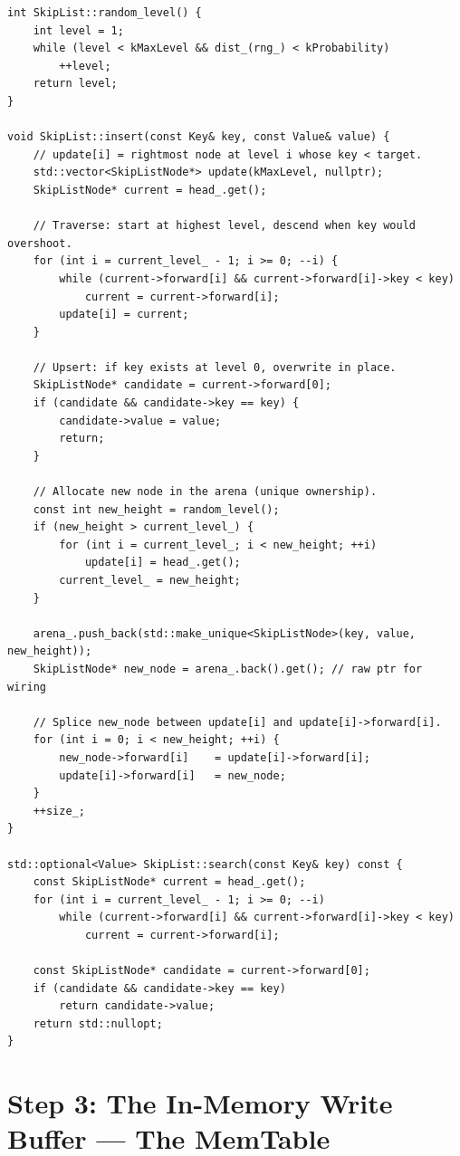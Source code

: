 \documentclass[11pt,a4paper]{article}
\begin{document}
\begin{lstlisting}[style=cpp, caption={Skip List Insert and Search: \texttt{src/skiplist.cpp}}]
int SkipList::random_level() {
    int level = 1;
    while (level < kMaxLevel && dist_(rng_) < kProbability)
        ++level;
    return level;
}

void SkipList::insert(const Key& key, const Value& value) {
    // update[i] = rightmost node at level i whose key < target.
    std::vector<SkipListNode*> update(kMaxLevel, nullptr);
    SkipListNode* current = head_.get();

    // Traverse: start at highest level, descend when key would overshoot.
    for (int i = current_level_ - 1; i >= 0; --i) {
        while (current->forward[i] && current->forward[i]->key < key)
            current = current->forward[i];
        update[i] = current;
    }

    // Upsert: if key exists at level 0, overwrite in place.
    SkipListNode* candidate = current->forward[0];
    if (candidate && candidate->key == key) {
        candidate->value = value;
        return;
    }

    // Allocate new node in the arena (unique ownership).
    const int new_height = random_level();
    if (new_height > current_level_) {
        for (int i = current_level_; i < new_height; ++i)
            update[i] = head_.get();
        current_level_ = new_height;
    }

    arena_.push_back(std::make_unique<SkipListNode>(key, value, new_height));
    SkipListNode* new_node = arena_.back().get(); // raw ptr for wiring

    // Splice new_node between update[i] and update[i]->forward[i].
    for (int i = 0; i < new_height; ++i) {
        new_node->forward[i]    = update[i]->forward[i];
        update[i]->forward[i]   = new_node;
    }
    ++size_;
}

std::optional<Value> SkipList::search(const Key& key) const {
    const SkipListNode* current = head_.get();
    for (int i = current_level_ - 1; i >= 0; --i)
        while (current->forward[i] && current->forward[i]->key < key)
            current = current->forward[i];

    const SkipListNode* candidate = current->forward[0];
    if (candidate && candidate->key == key)
        return candidate->value;
    return std::nullopt;
}
\end{lstlisting}

\section{Step 3: The In-Memory Write Buffer --- The MemTable}
\label{sec:memtable}
\end{document}
